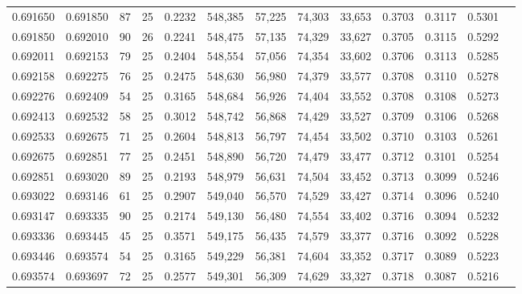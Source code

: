 \begin{tabular}{rrrrrrrrrrrrr}
0.691650 & 0.691850 &    87 &  25 &                                     0.2232 & 548,385 &  57,225 &  74,303 &  33,653 & 0.3703 & 0.3117 & 0.5301 \\
0.691850 & 0.692010 &    90 &  26 &                                     0.2241 & 548,475 &  57,135 &  74,329 &  33,627 & 0.3705 & 0.3115 & 0.5292 \\
0.692011 & 0.692153 &    79 &  25 &                                     0.2404 & 548,554 &  57,056 &  74,354 &  33,602 & 0.3706 & 0.3113 & 0.5285 \\
0.692158 & 0.692275 &    76 &  25 &                                     0.2475 & 548,630 &  56,980 &  74,379 &  33,577 & 0.3708 & 0.3110 & 0.5278 \\
0.692276 & 0.692409 &    54 &  25 &                                     0.3165 & 548,684 &  56,926 &  74,404 &  33,552 & 0.3708 & 0.3108 & 0.5273 \\
0.692413 & 0.692532 &    58 &  25 &                                     0.3012 & 548,742 &  56,868 &  74,429 &  33,527 & 0.3709 & 0.3106 & 0.5268 \\
0.692533 & 0.692675 &    71 &  25 &                                     0.2604 & 548,813 &  56,797 &  74,454 &  33,502 & 0.3710 & 0.3103 & 0.5261 \\
0.692675 & 0.692851 &    77 &  25 &                                     0.2451 & 548,890 &  56,720 &  74,479 &  33,477 & 0.3712 & 0.3101 & 0.5254 \\
0.692851 & 0.693020 &    89 &  25 &                                     0.2193 & 548,979 &  56,631 &  74,504 &  33,452 & 0.3713 & 0.3099 & 0.5246 \\
0.693022 & 0.693146 &    61 &  25 &                                     0.2907 & 549,040 &  56,570 &  74,529 &  33,427 & 0.3714 & 0.3096 & 0.5240 \\
0.693147 & 0.693335 &    90 &  25 &                                     0.2174 & 549,130 &  56,480 &  74,554 &  33,402 & 0.3716 & 0.3094 & 0.5232 \\
0.693336 & 0.693445 &    45 &  25 &                                     0.3571 & 549,175 &  56,435 &  74,579 &  33,377 & 0.3716 & 0.3092 & 0.5228 \\
0.693446 & 0.693574 &    54 &  25 &                                     0.3165 & 549,229 &  56,381 &  74,604 &  33,352 & 0.3717 & 0.3089 & 0.5223 \\
0.693574 & 0.693697 &    72 &  25 &                                     0.2577 & 549,301 &  56,309 &  74,629 &  33,327 & 0.3718 & 0.3087 & 0.5216 \\

\end{tabular}
